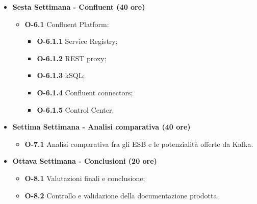 {\begin{itemize}
        \item \textbf{Sesta Settimana - Confluent (40 ore)}
        \begin{itemize}
          \item \textbf{O-6.1} Confluent Platform:
            \begin{itemize}
              \item \textbf{O-6.1.1} Service Registry;
              \item \textbf{O-6.1.2} REST proxy;
              \item \textbf{O-6.1.3} kSQL;
              \item \textbf{O-6.1.4} Confluent connectors;
              \item \textbf{O-6.1.5} Control Center.
            \end{itemize}
        \end{itemize}


        \item \textbf{Settima Settimana - Analisi comparativa (40 ore)}
        \begin{itemize}
            \item \textbf{O-7.1} Analisi comparativa fra gli ESB e le potenzialità offerte da Kafka.
        \end{itemize}


        \item \textbf{Ottava Settimana - Conclusioni (20 ore)}
        \begin{itemize}
            \item \textbf{O-8.1} Valutazioni finali e conclusione;
            \item \textbf{O-8.2} Controllo e validazione della documentazione prodotta.
        \end{itemize}

    \end{itemize}
}

\newcommand{\totaleOre}{}

\newcommand{\obiettiviObbligatori}{
	 \item \underline{\textit{O01}}: primo obiettivo;
	 \item \underline{\textit{O02}}: secondo obiettivo;
	 \item \underline{\textit{O03}}: terzo obiettivo;

}

\newcommand{\obiettiviDesiderabili}{
	 \item \underline{\textit{D01}}: primo obiettivo;
	 \item \underline{\textit{D02}}: secondo obiettivo;
}

\newcommand{\obiettiviFacoltativi}{
	 \item \underline{\textit{F01}}: primo obiettivo;
	 \item \underline{\textit{F02}}: secondo obiettivo;
	 \item \underline{\textit{F03}}: terzo obiettivo;
}
